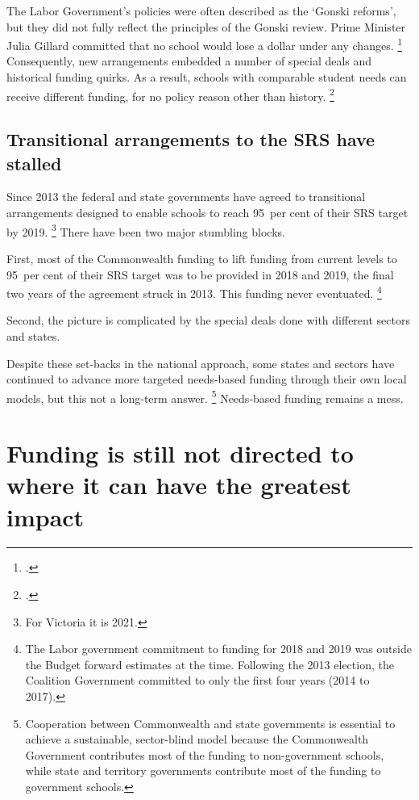 \documentclass{grattan}
\begin{document}
The Labor Government's policies were often described as the `Gonski reforms', but they did not fully reflect the principles of the Gonski review. Prime Minister Julia Gillard committed that no school would lose a dollar under any changes.%
\footcite[][xxi]{Gonski2011ReviewFundingSchooling}
Consequently, new arrangements embedded a number of special deals and historical funding quirks. As a result, schools with comparable student needs can receive different funding, for no policy reason other than history.%
\footcite{Gallash2013SecretGonskiDeals}

\subsection{Transitional arrangements to the SRS have stalled }\label{subsec:transitional-arrangements-to-the-srs-have-stalled}

Since 2013 the federal and state governments have agreed to transitional arrangements designed to enable schools to reach 95~per cent of their SRS target by 2019.%
\footnote{For Victoria it is 2021.} %
There have been two major stumbling blocks.

First, most of the Commonwealth funding to lift funding from current levels to 95~per cent of their SRS target was to be provided in 2018 and 2019, the final two years of the agreement struck in 2013.
This funding never eventuated.%
\footnote{The Labor government commitment to funding for 2018 and 2019 was outside the Budget forward estimates at the time.
Following the 2013 election, the Coalition Government committed to only the first four years (2014 to 2017).}

Second, the picture is complicated by the special deals done with different sectors and states.

Despite these set-backs in the national approach, some states and sectors have continued to advance more targeted needs-based funding through their own local models, but this not a long-term answer.%
\footnote{Cooperation between Commonwealth and state governments is essential to achieve a sustainable, sector-blind model because the Commonwealth Government contributes most of the funding to non-government schools, while state and territory governments contribute most of the funding to government schools.}
Needs-based funding remains a mess.

\section{Funding is still not directed to where it can have the greatest impact}\label{sec:current-situation-funding-is-still-not-directed-to-where-it-can-have-the-greatest-impact}
\end{document}
